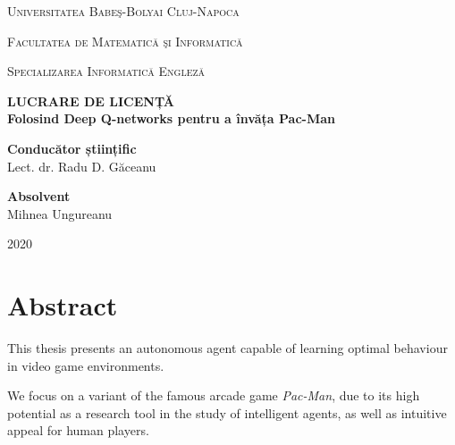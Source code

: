 \documentclass[12pt,twoside]{report}
\newcommand\blankpage{%
    \null
    \thispagestyle{empty}%
    \addtocounter{page}{-1}%
    \newpage}
\begin{document}
\begin{titlepage}
    \center %
    
    {\scshape\LARGE Universitatea Babeş-Bolyai Cluj-Napoca \par}
    \vspace{0.125cm}
    {\scshape\LARGE Facultatea de Matematică şi Informatică \par}
    \vspace{0.125cm}
    {\scshape\LARGE Specializarea Informatică Engleză \par}
    \vspace{5cm}
    
    {
        \bfseries
        \LARGE LUCRARE DE LICENȚĂ \\[1.5cm]
        \huge Folosind Deep Q-networks pentru a învăța Pac-Man
    }\\[4cm]
    
    \begin{flushleft}
        \Large
            \textbf{Conducător științific}
            \vspace{0.2cm}\\
        \Large
            Lect. dr. Radu D. Găceanu
            \vspace{0.125cm}\\
    \end{flushleft}
    
    \begin{flushright}
        \Large
            \textbf{Absolvent}
            \vspace{0.2cm}\\
        \Large
            Mihnea Ungureanu
    \end{flushright}
    
    \vfill
    
    {\center \large 2020}
    
\end{titlepage}

\blankpage

\chapter*{Abstract}
This thesis presents an autonomous agent capable of learning optimal behaviour in video game environments.

We focus on a variant of the famous arcade game \emph{Pac-Man}, due to its high potential as a research tool in the study of intelligent agents, as well as intuitive appeal for human players.
\end{document}
